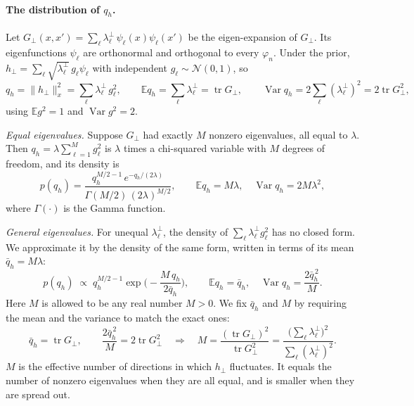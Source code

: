 \documentclass[11pt,a4paper]{article}
\newcommand{\E}{\mathbb{E}}
\newcommand{\tr}{\operatorname{tr}}
\begin{document}
\paragraph{The distribution of $q_h$.}
Let $G_\perp(x,x')=\sum_\ell\lambda^\perp_\ell\,\psi_\ell(x)\psi_\ell(x')$ be the eigen-expansion of $G_\perp$.
Its eigenfunctions $\psi_\ell$ are orthonormal and orthogonal to every $\varphi_n$.
Under the prior, $h_\perp=\sum_\ell\sqrt{\lambda^\perp_\ell}\,g_\ell\psi_\ell$ with independent $g_\ell\sim\mathcal N(0,1)$, so
\begin{equation*}
  q_h=\|h_\perp\|_x^2=\sum_\ell\lambda^\perp_\ell\,g_\ell^2,\qquad
  \E q_h=\sum_\ell\lambda^\perp_\ell=\tr G_\perp,\qquad
  \operatorname{Var}q_h=2\sum_\ell(\lambda^\perp_\ell)^2=2\tr G_\perp^2 ,
\end{equation*}
using $\E g^2=1$ and $\operatorname{Var}g^2=2$.

\emph{Equal eigenvalues.}
Suppose $G_\perp$ had exactly $M$ nonzero eigenvalues, all equal to $\lambda$.
Then $q_h=\lambda\sum_{\ell=1}^Mg_\ell^2$ is $\lambda$ times a chi-squared variable with $M$ degrees of freedom, and its density is
\begin{equation*}
  p(q_h)=\frac{q_h^{M/2-1}\,e^{-q_h/(2\lambda)}}{\Gamma(M/2)\,(2\lambda)^{M/2}},
  \qquad \E q_h=M\lambda,\quad \operatorname{Var}q_h=2M\lambda^2,
\end{equation*}
where $\Gamma(\cdot)$ is the Gamma function.

\emph{General eigenvalues.}
For unequal $\lambda^\perp_\ell$, the density of $\sum_\ell\lambda^\perp_\ell g_\ell^2$ has no closed form.
We approximate it by the density of the same form, written in terms of its mean $\bar q_h=M\lambda$:
\begin{equation}
  p(q_h)\;\propto\;q_h^{M/2-1}\exp\!\Big(-\frac{M\,q_h}{2\bar q_h}\Big),
  \qquad \E q_h=\bar q_h,\quad \operatorname{Var}q_h=\frac{2\bar q_h^{\,2}}{M}.
  \label{eq:gamma}
\end{equation}
Here $M$ is allowed to be any real number $M>0$.
We fix $\bar q_h$ and $M$ by requiring the mean and the variance to match the exact ones:
\begin{equation}
  \bar q_h=\tr G_\perp,\qquad
  \frac{2\bar q_h^{\,2}}{M}=2\tr G_\perp^2
  \quad\Longrightarrow\quad
  M=\frac{(\tr G_\perp)^2}{\tr G_\perp^2}=\frac{\big(\sum_\ell\lambda^\perp_\ell\big)^2}{\sum_\ell(\lambda^\perp_\ell)^2}.
  \label{eq:M}
\end{equation}
$M$ is the effective number of directions in which $h_\perp$ fluctuates.
It equals the number of nonzero eigenvalues when they are all equal, and is smaller when they are spread out.
\end{document}
